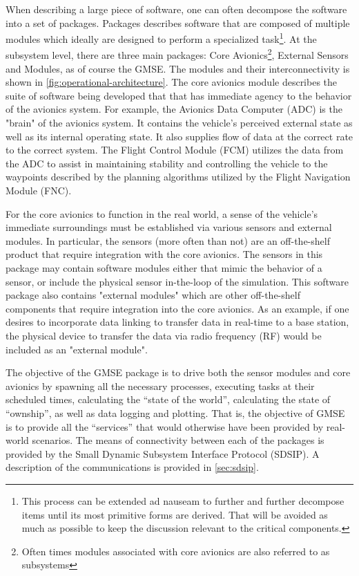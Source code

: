 When describing a large piece of software, one can often decompose the software into a set of
packages. Packages describes software that are composed of multiple modules which ideally are
designed to perform a specialized task\footnote{This process can be extended ad nauseam to further
and further decompose items until its most primitive forms are derived. That will be avoided as much
as possible to keep the discussion relevant to the critical components.}. At the subsystem level,
there are three main packages: Core Avionics\footnote{Often times modules associated with core
avionics are also referred to as subsystems}, External Sensors and Modules, as of course the GMSE.
The modules and their interconnectivity is shown in \autoref{fig:operational-architecture}. The core
avionics module describes the suite of software being developed that that has immediate agency to
the behavior of the avionics system. For example, the Avionics Data Computer (ADC) is the "brain" of
the avionics system. It contains the vehicle's perceived external state as well as its internal
operating state. It also supplies flow of data at the correct rate to the correct system. The Flight
Control Module (FCM) utilizes the data from the ADC to assist in maintaining stability and
controlling the vehicle to the waypoints described by the planning algorithms utilized by the Flight
Navigation Module (FNC).

For the core avionics to function in the real world, a sense of the vehicle's immediate surroundings
must be established via various sensors and external modules. In particular, the sensors (more often
than not) are an off-the-shelf product that require integration with the core avionics. The sensors
in this package may contain software modules either that mimic the behavior of a sensor, or include
the physical sensor in-the-loop of the simulation. This software package also contains "external
modules" which are other off-the-shelf components that require integration into the core avionics.
As an example, if one desires to incorporate data linking to transfer data in real-time to a base
station, the physical device to transfer the data via radio frequency (RF) would be included as an
"external module".

The objective of the GMSE package is to drive both the sensor modules and core avionics by spawning
all the necessary processes, executing tasks at their scheduled times, calculating the ``state of
the world'', calculating the state of ``ownship'', as well as data logging and plotting. That is,
the objective of GMSE is to provide all the ``services'' that would otherwise have been provided by
real-world scenarios. The means of connectivity between each of the packages is provided by the
Small Dynamic Subsystem Interface Protocol (SDSIP). A description of the communications is provided
in \autoref{sec:sdsip}.

